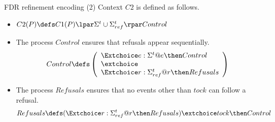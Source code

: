 \documentclass[fleqn]{beamer}
\newenvironment{slide-nocite}[1]
{\begin{frame}[fragile,environment=slide-nocite]
\frametitle{#1}\begin{refsegment}}
{\end{refsegment}\end{frame}}%
\begin{document}
\begin{slide-nocite}{FDR refinement encoding (2)}
Context $C2$ is defined as follows.
\begin{itemize}
  \item $C2(P) \circdef C1(P) \lpar \Sigma^{t} \cup \Sigma^{t}_{ref} \rpar Control$
  \item The process $Control$ ensures that refusals appear sequentially.
   \begin{align*}
      Control \circdef \left(\begin{array}{l}
        \Extchoice e : \Sigma^{t} @ e \then Control
        \\ \extchoice \\
        \Extchoice r : \Sigma^{t}_{ref} @ r \then Refusals
      \end{array}\right)
    \end{align*}
  \item The process $Refusals$ ensures that no events other than $tock$ can follow
    a refusal.
    \begin{align*}
      Refusals \circdef (\Extchoice r : \Sigma^{t}_{ref} @ r \then Refusals) \extchoice tock \then Control
    \end{align*}
\end{itemize}
\end{slide-nocite}

%
\end{document}
